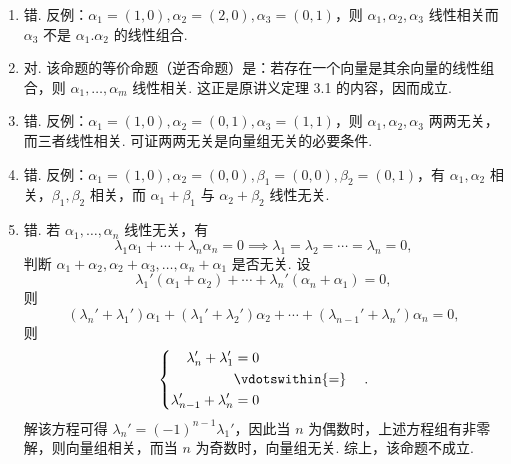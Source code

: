 \documentclass[UTF8,12pt,a4paper,fontset=fandol]{ctexart}
\begin{document}
\begin{solve}
\begin{enumerate}
                \item 错. 反例：$\alpha_1=(1,0),\alpha_2=(2,0),\alpha_3=(0,1)$，则 $\alpha_1,\alpha_2,\alpha_3$ 线性相关而 $\alpha_3$ 不是 $\alpha_1.\alpha_2$ 的线性组合.

                \item 对. 该命题的等价命题（逆否命题）是：若存在一个向量是其余向量的线性组合，则 $\alpha_1,\ldots,\alpha_m$ 线性相关. 这正是原讲义定理 3.1 的内容，因而成立.

                \item 错. 反例：$\alpha_1=(1,0),\alpha_2=(0,1),\alpha_3=(1,1)$，则 $\alpha_1,\alpha_2,\alpha_3$ 两两无关，而三者线性相关. 可证两两无关是向量组无关的必要条件.

                \item 错. 反例：$\alpha_1=(1,0),\alpha_2=(0,0),\beta_1=(0,0),\beta_2=(0,1)$，有 $\alpha_1,\alpha_2$ 相关，$\beta_1,\beta_2$ 相关，而 $\alpha_1+\beta_1$ 与 $\alpha_2+\beta_2$ 线性无关.

                \item 错. 若 $\alpha_1,\ldots,\alpha_n$ 线性无关，有
                    \[\lambda_1\alpha_1+\cdots+\lambda_n\alpha_n=0\implies\lambda_1=\lambda_2=\cdots=\lambda_n=0,\]
                    判断 $\alpha_1+\alpha_2,\alpha_2+\alpha_3,\ldots,\alpha_n+\alpha_1$ 是否无关. 设
                    \[\lambda_1'(\alpha_1+\alpha_2)+\cdots+\lambda_n'(\alpha_n+\alpha_1)=0,\]
                    则
                    \[(\lambda_n'+\lambda_1')\alpha_1+(\lambda_1'+\lambda_2')\alpha_2+\cdots+(\lambda_{n-1}'+\lambda_{n}')\alpha_n=0,\]
                    则
                    \[\begin{cases} \begin{aligned}
                                \lambda_n'+\lambda_1'       & = 0               \\
                                                            & \vdotswithin{ = } \\
                                \lambda_{n-1}'+\lambda_{n}' & = 0               \\
                            \end{aligned} \end{cases}.\]
                    解该方程可得 $\lambda_n'=(-1)^{n-1}\lambda_1'$，因此当 $n$ 为偶数时，上述方程组有非零解，则向量组相关，而当 $n$ 为奇数时，向量组无关. 综上，该命题不成立.


\end{enumerate}
\end{solve}
\end{document}
